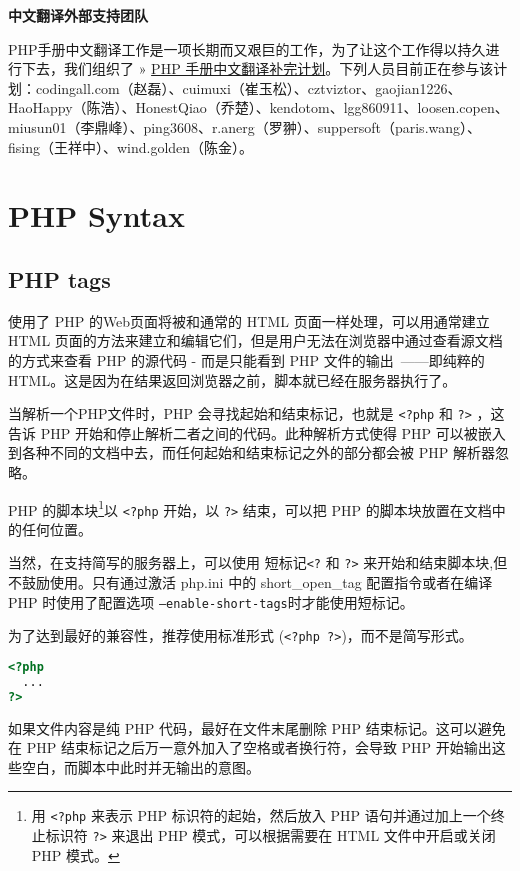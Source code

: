 {\CTEXnoindent\textbf{中文翻译外部支持团队}}

PHP手册中文翻译工作是一项长期而又艰巨的工作，为了让这个工作得以持久进行下去，我们组织了 » \href{http://code.google.com/p/phpdoc-zh/}{PHP 手册中文翻译补完计划}。下列人员目前正在参与该计划：codingall.com（赵磊）、cuimuxi（崔玉松）、cztviztor、gaojian1226、HaoHappy（陈浩）、HonestQiao（乔楚）、kendotom、lgg860911、loosen.copen、miusun01（李鼎峰）、ping3608、r.anerg（罗翀）、suppersoft（paris.wang）、fising（王祥中）、wind.golden（陈金）。

\chapter{PHP Syntax}

\section{PHP tags}



使用了 PHP 的Web页面将被和通常的 HTML 页面一样处理，可以用通常建立 HTML 页面的方法来建立和编辑它们，但是用户无法在浏览器中通过查看源文档的方式来查看 PHP 的源代码 - 而是只能看到 PHP 文件的输出~——即纯粹的 HTML。这是因为在结果返回浏览器之前，脚本就已经在服务器执行了。

当解析一个PHP文件时，PHP 会寻找起始和结束标记，也就是 \texttt{<?php} 和 \texttt{?>} ，这告诉 PHP 开始和停止解析二者之间的代码。此种解析方式使得 PHP 可以被嵌入到各种不同的文档中去，而任何起始和结束标记之外的部分都会被 PHP 解析器忽略。


PHP 的脚本块\footnote{用 \texttt{<?php} 来表示 PHP 标识符的起始，然后放入 PHP 语句并通过加上一个终止标识符 \texttt{?>} 来退出 PHP 模式，可以根据需要在 HTML 文件中开启或关闭 PHP 模式。}以 \texttt{<?php} 开始，以 \texttt{?>} 结束，可以把 PHP 的脚本块放置在文档中的任何位置。

当然，在支持简写的服务器上，可以使用 短标记\texttt{<?} 和 \texttt{?>} 来开始和结束脚本块,但不鼓励使用。只有通过激活 php.ini 中的 short\_open\_tag 配置指令或者在编译 PHP 时使用了配置选项 \texttt{--enable-short-tags}时才能使用短标记。

为了达到最好的兼容性，推荐使用标准形式 (\texttt{<?php ?>})，而不是简写形式。

\begin{lstlisting}[language=PHP]
<?php
  ...
?>
\end{lstlisting}

如果文件内容是纯 PHP 代码，最好在文件末尾删除 PHP 结束标记。这可以避免在 PHP 结束标记之后万一意外加入了空格或者换行符，会导致 PHP 开始输出这些空白，而脚本中此时并无输出的意图。


